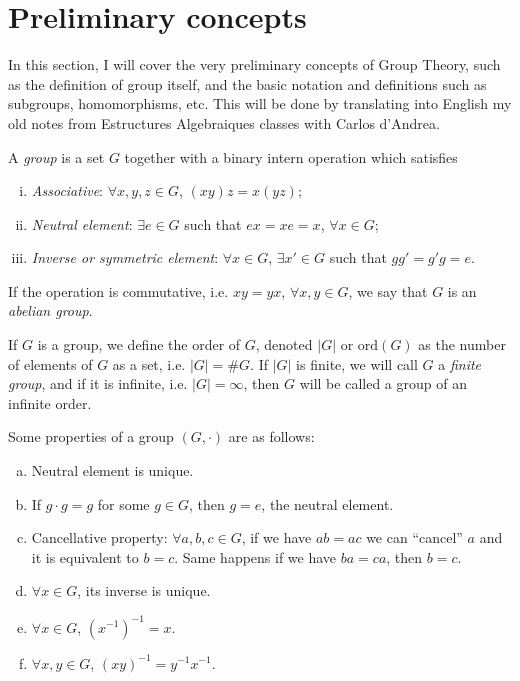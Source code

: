\documentclass[../main.tex]{subfiles}
\begin{document}
\section{Preliminary concepts}

In this section, I will cover the very preliminary concepts of Group Theory, such as the definition of group itself, and the basic notation and definitions such as subgroups, homomorphisms, etc. This will be done by translating into English my old notes from Estructures Algebraiques classes with Carlos d'Andrea.


\begin{defi}[Group]
A \textit{group} is a set $G$ together with a binary intern operation which satisfies
\begin{enumerate}[(i)]
    \item \textit{Associative}: $\forall x, y, z\in G$, $(xy)z = x(yz)$;
    \item \textit{Neutral element}: $\exists e\in G$ such that $ex = xe = x$, $\forall x\in G$;
    \item \textit{Inverse or symmetric element}: $\forall x\in G$, $\exists x'\in G$ such that $gg' = g'g = e$.
\end{enumerate}
If the operation is commutative, i.e. $xy = yx$, $\forall x,y\in G$, we say that $G$ is an \textit{abelian group}.
\end{defi}

\begin{defi}
If $G$ is a group, we define the order of $G$, denoted $|G|$ or $\mathrm{ord}(G)$ as the number of elements of $G$ as a set, i.e. $|G| = \#G$. If $|G|$ is finite, we will call $G$ a \textit{finite group}, and if it is infinite, i.e. $|G| = \infty$, then $G$ will be called a group of an infinite order.
\end{defi}


\begin{prop}
Some properties of a group $(G,\cdotp)$ are as follows:
\begin{enumerate}[(a)]
    \item Neutral element is unique.
    \item If $g\cdotp g = g$ for some $g\in G$, then $g = e$, the neutral element.
    \item Cancellative property: $\forall a,b,c\in G$, if we have $ab=ac$ we can ``cancel'' $a$ and it is equivalent to $b= c$. Same happens if we have $ba = ca$, then $b = c$.
    \item $\forall x\in G$, its inverse is unique.
    \item $\forall x\in G$, $(x^{-1})^{-1} = x$.
    \item $\forall x,y\in G$, $(xy)^{-1} = y^{-1}x^{-1}$.
\end{enumerate}
\end{prop}
\end{document}
